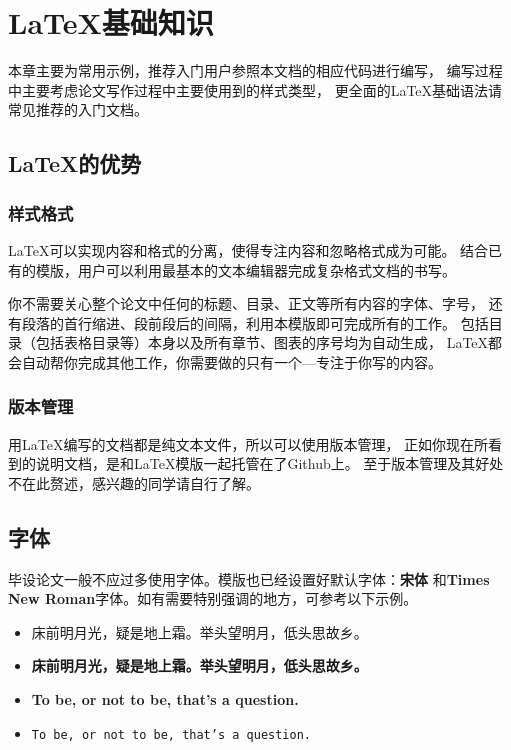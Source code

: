 \chapter{\LaTeX{}基础知识}
\label{chapter-basic}

本章主要为常用示例，推荐入门用户参照本文档的相应代码进行编写，
编写过程中主要考虑论文写作过程中主要使用到的样式类型，
更全面的\LaTeX{}基础语法请常见推荐的入门文档。

\section{\LaTeX{}的优势}
\label{sec-latex-advantage}

\subsection{样式格式}
\label{subsec-style}

\LaTeX{}可以实现内容和格式的分离，使得专注内容和忽略格式成为可能。
结合已有的模版，用户可以利用最基本的文本编辑器完成复杂格式文档的书写。

你不需要关心整个论文中任何的标题、目录、正文等所有内容的字体、字号，
还有段落的首行缩进、段前段后的间隔，利用本模版即可完成所有的工作。
包括目录（包括表格目录等）本身以及所有章节、图表的序号均为自动生成，
\LaTeX{}都会自动帮你完成其他工作，你需要做的只有一个---专注于你写的内容。

\subsection{版本管理}
\label{subsec-version-control}

用\LaTeX{}编写的文档都是纯文本文件，所以可以使用版本管理，
正如你现在所看到的说明文档，是和\LaTeX{}模版一起托管在了Github上。
至于版本管理及其好处不在此赘述，感兴趣的同学请自行了解。

\section{字体}
\label{sec-font}

毕设论文一般不应过多使用字体。模版也已经设置好默认字体：{\bf 宋体}
和{\bf Times New Roman}字体。如有需要特别强调的地方，可参考以下示例。
\begin{itemize}
    \item {\heiti 床前明月光，疑是地上霜。举头望明月，低头思故乡。}
    \item {\bf 床前明月光，疑是地上霜。举头望明月，低头思故乡。}
    \item \textbf{To be, or not to be, that's a question.}
    \item \texttt{To be, or not to be, that's a question.}
\end{itemize}

